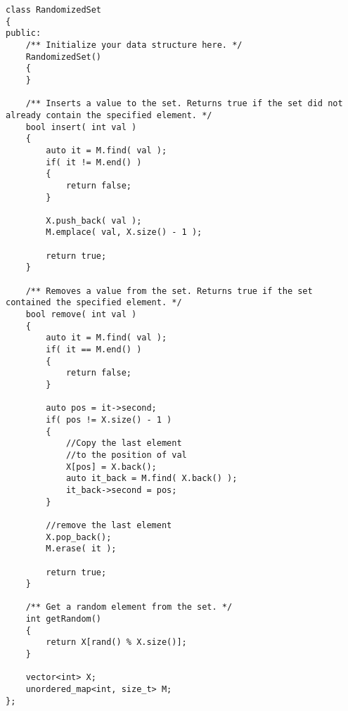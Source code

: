 \setcounter{lstlisting}{0}
\begin{lstlisting}[style=customc, caption={Hash Map}]
class RandomizedSet
{
public:
    /** Initialize your data structure here. */
    RandomizedSet()
    {
    }

    /** Inserts a value to the set. Returns true if the set did not already contain the specified element. */
    bool insert( int val )
    {
        auto it = M.find( val );
        if( it != M.end() )
        {
            return false;
        }

        X.push_back( val );
        M.emplace( val, X.size() - 1 );

        return true;
    }

    /** Removes a value from the set. Returns true if the set contained the specified element. */
    bool remove( int val )
    {
        auto it = M.find( val );
        if( it == M.end() )
        {
            return false;
        }

        auto pos = it->second;
        if( pos != X.size() - 1 )
        {
            //Copy the last element
            //to the position of val
            X[pos] = X.back();
            auto it_back = M.find( X.back() );
            it_back->second = pos;
        }

        //remove the last element
        X.pop_back();
        M.erase( it );

        return true;
    }

    /** Get a random element from the set. */
    int getRandom()
    {
        return X[rand() % X.size()];
    }

    vector<int> X;
    unordered_map<int, size_t> M;
};
\end{lstlisting}